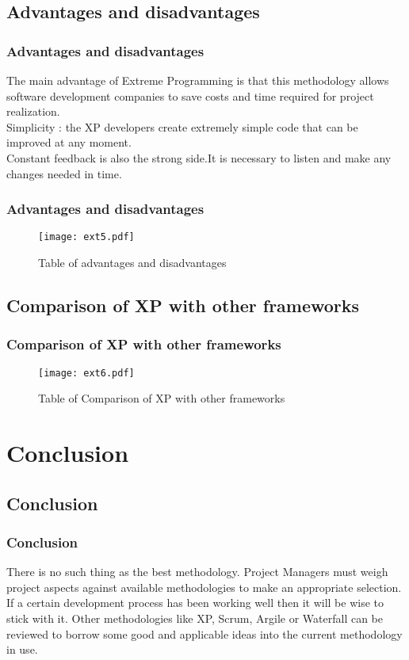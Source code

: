 \documentclass[	11pt, ]{beamer}
\begin{document}
\subsection{Advantages and disadvantages}
\begin{frame}
	\frametitle{Advantages and disadvantages}
The main advantage of Extreme Programming is that this methodology allows
software development companies to save costs and time required for project
realization.\\ \pause
Simplicity : the XP developers create extremely simple code that can be
improved at any moment.\\ \pause
Constant feedback is also the strong side.It is necessary to listen and make
any changes needed in time.
	\bigskip %
\end{frame}
\begin{frame}
	\frametitle{Advantages and disadvantages}
	\begin{figure}
		\texttt{[image: ext5.pdf]}
		\caption{Table of advantages and disadvantages}
	\end{figure}
\end{frame}
\subsection{Comparison of XP with other frameworks}
\begin{frame}
	\frametitle{Comparison of XP with other frameworks}
	\begin{figure}
		\texttt{[image: ext6.pdf]}
		\caption{Table of Comparison of XP with other frameworks}
	\end{figure}
	\bigskip %
\end{frame}
\section{Conclusion}
\subsection{Conclusion}
\begin{frame}
	\frametitle{Conclusion}
	There is no such thing as the best methodology. Project Managers must weigh project aspects against available methodologies to make an
appropriate selection. If a certain development process has been working well then it will be wise to stick with it. Other methodologies like XP,
Scrum, Argile or Waterfall can be reviewed to borrow some good and applicable ideas into the current methodology in use.
	\bigskip %
\end{frame}
\end{document}
